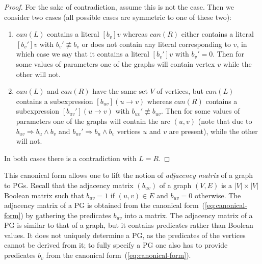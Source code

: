 \begin{proof}
For the sake of contradiction, assume this is not the case. Then we
consider two cases (all possible cases are symmetric to one of these
two):
\begin{enumerate}
\item $\mathit{can}(L)$ contains a literal $[b_{v}]v$ whereas $\mathit{can}(R)$
either contains a literal $[b_{v}']v$ with $b_{v}'\not\equiv b_{v}$
or does not contain any literal corresponding to $v$, in which case
we say that it contains a literal $[b_{v}']v$ with $b_{v}'=0$. Then
for some values of parameters one of the graphs will contain vertex
$v$ while the other will not.
\item $\mathit{can}(L)$ and $\mathit{can}(R)$ have the same set $V$ of
vertices, but $\mathit{can}(L)$ contains a subexpression \foreignlanguage{english}{$[b_{uv}](u\rightarrow v)$}
whereas $\mathit{can}(R)$ contains a subexpression \foreignlanguage{english}{$[b_{uv}'](u\rightarrow v)$}
with $b_{uv}'\not\equiv b_{uv}$. Then for some values of parameters
one of the graphs will contain the arc $(u,v)$ (note that due to
$b_{uv}\Rightarrow b_{u}\wedge b_{v}$ and $b_{uv}'\Rightarrow b_{u}\wedge b_{v}$
vertices $u$ and $v$ are present), while the other will not.
\end{enumerate}
In both cases there is a contradiction with $L=R$.
\end{proof}
This canonical form allows one to lift the notion of \emph{adjacency
matrix} of a graph to PGs. Recall that the adjacency matrix $(b_{uv})$
of a graph $(V,E)$ is a $|V|\times|V|$ Boolean matrix such that
$b_{uv}=1$ if $(u,v)\in E$ and $b_{uv}=0$ otherwise. The adjacency
matrix of a PG is obtained from the canonical form~(\ref{eq:canonical-form})
by gathering the predicates $b_{uv}$ into a matrix. The adjacency
matrix of a PG is similar to that of a graph, but it contains predicates
rather than Boolean values. It does not uniquely determine a PG, as
the predicates of the vertices cannot be derived from it; to fully
specify a PG one also has to provide predicates $b_{v}$ from the
canonical form~(\ref{eq:canonical-form}). 

